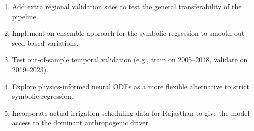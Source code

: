 \documentclass[12pt, a4paper]{article}
\begin{document}
\begin{enumerate}[leftmargin=1.6em]
    \item Add extra regional validation sites to test the general transferability of the pipeline.
    \item Implement an ensemble approach for the symbolic regression to smooth out seed-based variations.
    \item Test out-of-sample temporal validation (e.g., train on 2005--2018, validate on 2019--2023).
    \item Explore physics-informed neural ODEs as a more flexible alternative to strict symbolic regression.
    \item Incorporate actual irrigation scheduling data for Rajasthan to give the model access to the dominant anthropogenic driver.
\end{enumerate}
\end{document}
